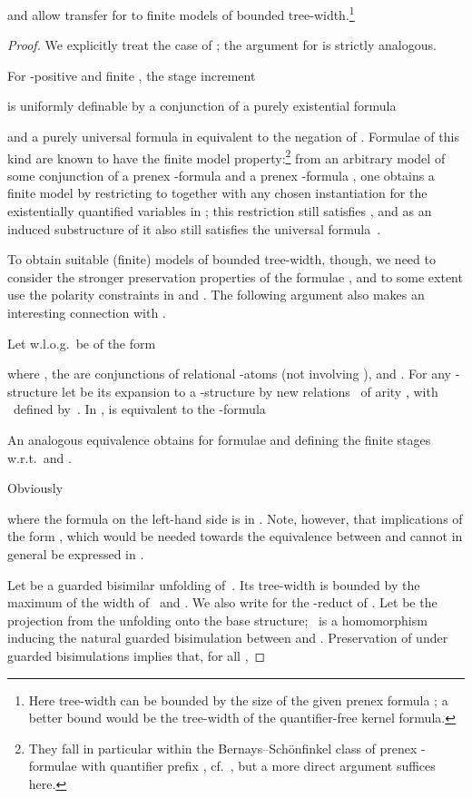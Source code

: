 \documentclass{LMCS}
\begin{document}
\begin{thm}
\begin{lem}
 and  allow transfer for  to
finite models of bounded tree-width.\footnote{Here tree-width can be bounded by
the size of the given prenex formula \?; a better bound
would be the tree-width of the quantifier-free kernel formula.}
\end{lem}
\begin{proof}
We explicitly treat the case of \?; the argument for  is
strictly analogous.

For -positive  and finite ,
the stage increment

is uniformly definable by a conjunction of a purely existential
formula

and a purely universal
formula in  equivalent to the negation of .
Formulae of this kind are known to have the finite
model property\?:\footnote{They fall in particular within
the Bernays--Sch\"onfinkel class of prenex -formulae
with quantifier prefix , cf.~\cite{BGG},
but a more direct argument suffices here.}
from an arbitrary model  of some conjunction of a prenex
-formula  and a prenex
-formula , one obtains a finite model
by restricting  to  together with any chosen instantiation for the
existentially quantified variables in \?; this restriction
still satisfies , and as an induced substructure
of  it also still satisfies the universal
formula~.

To obtain suitable (finite) models of bounded tree-width,
though, we need to consider the stronger preservation properties of
the formulae ,
and to some extent use the polarity constraints in  and .
The following argument also makes an interesting connection
with .

Let w.l.o.g.\  be of the form

where ,
the  are conjunctions of relational -atoms
(not involving ), and .
For any -structure  let  be its expansion to
a -structure by new relations~
of arity , with ~defined by~.
In ,  is equivalent to the -formula


An analogous equivalence obtains for formulae 
and 
defining the finite stages w.r.t.\  and .

Obviously

where the
formula on the left-hand side is in .
Note, however, that implications of the form
,
which would be needed
towards the equivalence between  and 
cannot in general be expressed in .

Let  be a guarded bisimilar unfolding of~.
Its tree-width is bounded by the maximum of
the width of~ and .
We also write  for the -reduct of .
Let  be the
projection from the unfolding onto the base structure\?;
~is a homomorphism inducing the natural guarded bisimulation
between  and .
Preservation of  under guarded bisimulations implies
that, for all ,



\end{proof}
\end{thm}
\end{document}
